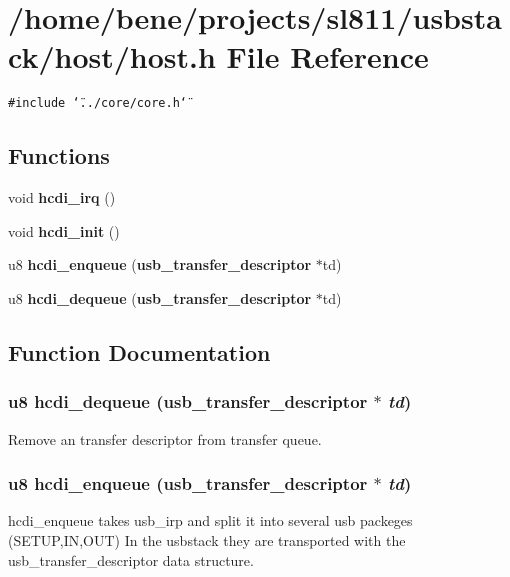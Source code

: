 \section{/home/bene/projects/sl811/usbstack/host/host.h File Reference}
\label{host_8h}
{\tt \#include \char`\"{}../core/core.h\char`\"{}}\par
\subsection*{Functions}
\begin{CompactItemize}
\item 
void {\bf hcdi\_\-irq} ()
\item 
void {\bf hcdi\_\-init} ()
\item 
u8 {\bf hcdi\_\-enqueue} ({\bf usb\_\-transfer\_\-descriptor} $\ast$td)
\item 
u8 {\bf hcdi\_\-dequeue} ({\bf usb\_\-transfer\_\-descriptor} $\ast$td)
\end{CompactItemize}


\subsection{Function Documentation}
\subsubsection{\setlength{\rightskip}{0pt plus 5cm}u8 hcdi\_\-dequeue ({\bf usb\_\-transfer\_\-descriptor} $\ast$ {\em td})}\label{host_8h_2937060a6cc3d0d69f04ea1d33d24de1}


Remove an transfer descriptor from transfer queue. 
\subsubsection{\setlength{\rightskip}{0pt plus 5cm}u8 hcdi\_\-enqueue ({\bf usb\_\-transfer\_\-descriptor} $\ast$ {\em td})}\label{host_8h_156486d5382dea364107d54250a29795}


hcdi\_\-enqueue takes usb\_\-irp and split it into several usb packeges (SETUP,IN,OUT) In the usbstack they are transported with the usb\_\-transfer\_\-descriptor data structure. 
